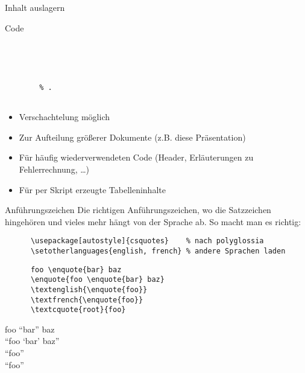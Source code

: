 \begin{frame}[fragile]{Inhalt auslagern}
  \begin{block}{Code}
    \begin{lstlisting}
      
      
        
        
        % .
      
    \end{lstlisting}
  \end{block}
  \begin{itemize}
    \item Verschachtelung möglich
    \item Zur Aufteilung größerer Dokumente (z.B. diese Präsentation)
    \item Für häufig wiederverwendeten Code (Header, Erläuterungen zu Fehlerrechnung, …)
    \item Für per Skript erzeugte Tabelleninhalte
  \end{itemize}
\end{frame}

\begin{frame}[fragile]{
  Anführungszeichen
  \hfill
}
  Die richtigen Anführungszeichen, wo die Satzzeichen hingehören und vieles mehr hängt von der Sprache ab.
  So macht man es richtig:
  \begin{Packages}
    \begin{lstlisting}
      \usepackage[autostyle]{csquotes}    % nach polyglossia
      \setotherlanguages{english, french} % andere Sprachen laden
    \end{lstlisting}
  \end{Packages}
  \begin{CodeExample}{0.60}
    \begin{lstlisting}
      foo \enquote{bar} baz
      \enquote{foo \enquote{bar} baz}
      \textenglish{\enquote{foo}}
      \textfrench{\enquote{foo}}
      \textcquote{root}{foo}
    \end{lstlisting}
  \CodeResult
    \strut
    foo \enquote{bar} baz \\
    \enquote{foo \enquote{bar} baz} \\
    \textenglish{\enquote{foo}} \\
    \textfrench{ \enquote{foo}} \\
  \end{CodeExample}
\end{frame}

